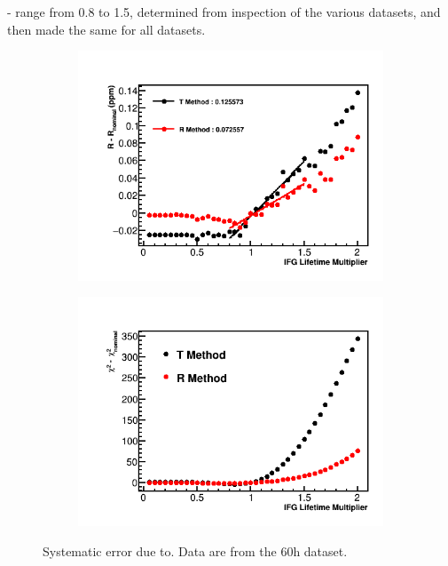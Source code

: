 - range from 0.8 to 1.5, determined from inspection of the various datasets, and then made the same for all datasets.


\begin{figure}[h]
\centering
    \begin{subfigure}[t]{0.45\textwidth}
        \centering
        \includegraphics[width=\textwidth]{IFG_Lifetime_Compare_R}
        \caption{}
    \end{subfigure}%
    \hspace{1cm}
    \begin{subfigure}[t]{0.45\textwidth}
        \centering
        \includegraphics[width=\textwidth]{IFG_Lifetime_Compare_Chisq}
        \caption{}
    \end{subfigure}
\caption[Systematic error due to]{Systematic error due to. Data are from the 60h dataset.}
\label{fig:IFGAmpscan}
\end{figure}


